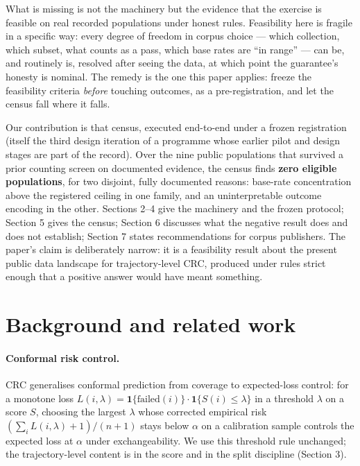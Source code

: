 \documentclass[11pt]{article}
\begin{document}
What is missing is not the machinery but the evidence that the
exercise is feasible on real recorded populations under honest
rules. Feasibility here is fragile in a specific way: every
degree of freedom in corpus choice --- which collection, which
subset, what counts as a pass, which base rates are ``in
range'' --- can be, and routinely is, resolved after seeing the
data, at which point the guarantee's honesty is nominal. The
remedy is the one this paper applies: freeze the feasibility
criteria \emph{before} touching outcomes, as a pre-registration,
and let the census fall where it falls.

Our contribution is that census, executed end-to-end under a
frozen registration (itself the third design iteration of a
programme whose earlier pilot and design stages are part of the
record). Over the nine public populations that survived a
prior counting screen on documented evidence, the census finds
\textbf{zero eligible populations}, for two disjoint,
fully documented reasons: base-rate concentration above the
registered ceiling in one family, and an uninterpretable
outcome encoding in the other. Sections 2--4 give the machinery
and the frozen protocol; Section 5 gives the census; Section 6
discusses what the negative result does and does not establish;
Section 7 states recommendations for corpus publishers. The
paper's claim is deliberately narrow: it is a feasibility
result about the present public data landscape for
trajectory-level CRC, produced under rules strict enough that a
positive answer would have meant something.

\section{Background and related work}

\paragraph{Conformal risk control.} CRC
\citep{angelopoulos2022conformal} generalises conformal
prediction from coverage to expected-loss control: for a
monotone loss $L(i, \lambda) = \mathbf{1}\{\text{failed}(i)\}
\cdot \mathbf{1}\{S(i) \le \lambda\}$ in a threshold $\lambda$
on a score $S$, choosing the largest $\lambda$ whose corrected
empirical risk $(\sum_i L(i,\lambda) + 1)/(n+1)$ stays below
$\alpha$ on a calibration sample controls the expected loss at
$\alpha$ under exchangeability. We use this threshold rule
unchanged; the trajectory-level content is in the score and in
the split discipline (Section 3).
\end{document}
